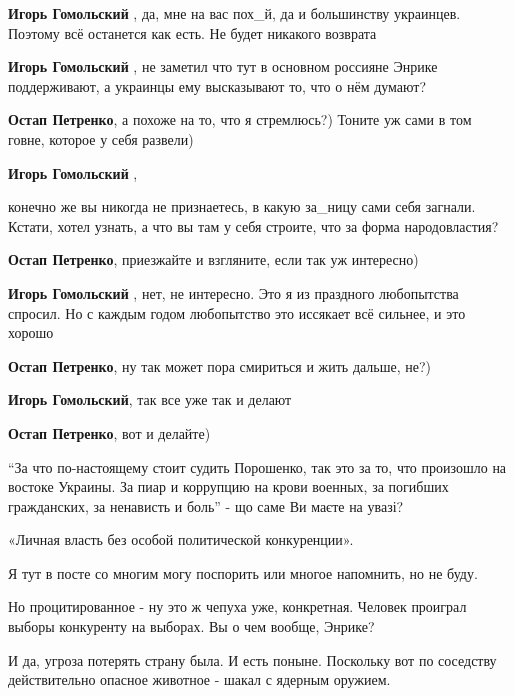 \begin{itemize}
\begin{itemize}
\textbf{Игорь Гомольский} , да, мне на вас пох\_й, да и большинству украинцев. Поэтому всё останется как есть. Не будет никакого возврата

\textbf{Игорь Гомольский} , не заметил что тут в основном россияне Энрике поддерживают, а украинцы ему высказывают то, что о нём думают?

\textbf{Остап Петренко}, а похоже на то, что я стремлюсь?) Тоните уж сами в том говне, которое у себя развели)

\textbf{Игорь Гомольский} , 

конечно же вы никогда не признаетесь, в какую за\_ницу сами себя загнали.
Кстати, хотел узнать, а что вы там у себя строите, что за форма народовластия?

\textbf{Остап Петренко}, приезжайте и взгляните, если так уж интересно)

\textbf{Игорь Гомольский} , нет, не интересно. Это я из праздного любопытства спросил. Но с каждым годом любопытство это иссякает всё сильнее, и это хорошо

\textbf{Остап Петренко}, ну так может пора смириться и жить дальше, не?)

\textbf{Игорь Гомольский}, так все уже так и делают

\textbf{Остап Петренко}, вот и делайте)
\end{itemize} %


\enquote{За что по-настоящему стоит судить Порошенко, так это за то, что произошло на
востоке Украины. За пиар и коррупцию на крови военных, за погибших гражданских,
за ненависть и боль} - що саме Ви маєте на увазі?


«Личная власть без особой политической конкуренции».

Я тут в посте со многим могу поспорить или многое напомнить, но не буду.

Но процитированное - ну это ж чепуха уже, конкретная. Человек проиграл выборы
конкуренту на выборах. Вы о чем вообще, Энрике?

И да, угроза потерять страну была. И есть поныне. Поскольку вот по соседству
действительно опасное животное - шакал с ядерным оружием.

\begin{itemize} %


\end{itemize}
\end{itemize}
